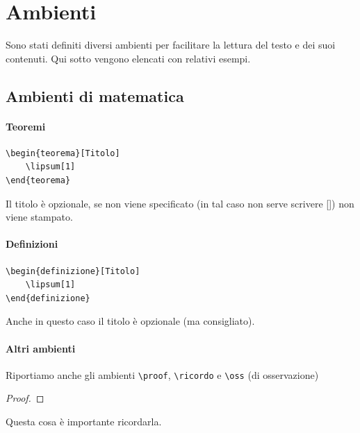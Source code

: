 \documentclass{classnotes}
\def\tbs{\textbackslash}
\begin{document}
\chapter{Ambienti} %
Sono stati definiti diversi ambienti per facilitare la lettura del testo e dei suoi contenuti.
Qui sotto vengono elencati con relativi esempi.

\section{Ambienti di matematica}

\subsubsection*{Teoremi}
\begin{verbatim}
\begin{teorema}[Titolo]
    \lipsum[1]
\end{teorema}
\end{verbatim}
\begin{teorema}[Titolo]
    \lipsum[1]
\end{teorema}
Il titolo è opzionale, se non viene specificato (in tal caso non serve scrivere [\space]) non viene stampato.


\subsubsection*{Definizioni}
\begin{verbatim}
\begin{definizione}[Titolo]
    \lipsum[1]
\end{definizione}
\end{verbatim}
\begin{definizione}[Titolo]
    \lipsum[1]
\end{definizione}
Anche in questo caso il titolo è opzionale (ma consigliato).

\subsubsection*{Altri ambienti}
Riportiamo anche gli ambienti \texttt{\tbs proof}, \texttt{\tbs ricordo} e \texttt{\tbs oss} (di osservazione)
\begin{proof}
    \lipsum[1]
\end{proof}
\begin{ricordo}
    Questa cosa è importante ricordarla.
\end{ricordo}
\end{document}

